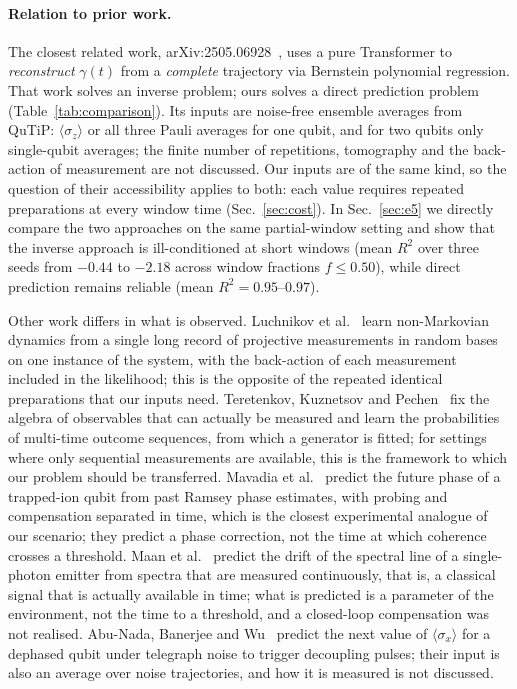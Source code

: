 \documentclass[twocolumn,10pt]{article}
\begin{document}
\paragraph{Relation to prior work.}
The closest related work, arXiv:2505.06928~\cite{TransformerLindblad2025},
uses a pure Transformer to \emph{reconstruct} $\gamma(t)$ from a
\emph{complete} trajectory via Bernstein polynomial regression.
That work solves an inverse problem; ours solves a direct prediction
problem (Table~\ref{tab:comparison}).
Its inputs are noise-free ensemble averages from QuTiP: $\langle\sigma_z\rangle$
or all three Pauli averages for one qubit, and for two qubits only
single-qubit averages; the finite number of repetitions, tomography and
the back-action of measurement are not discussed. Our inputs are of the
same kind, so the question of their accessibility applies to both: each
value requires repeated preparations at every window time
(Sec.~\ref{sec:cost}).
In Sec.~\ref{sec:e5} we directly compare the two approaches on the same
partial-window setting and show that the inverse approach is
ill-conditioned at short windows (mean $R^2$ over three seeds from $-0.44$
to $-2.18$ across window fractions $f \leq 0.50$), while direct prediction
remains reliable (mean $R^2 = 0.95$--$0.97$).

Other work differs in what is observed. Luchnikov et
al.~\cite{Luchnikov2020} learn non-Markovian dynamics from a single long
record of projective measurements in random bases on one instance of the
system, with the back-action of each measurement included in the
likelihood; this is the opposite of the repeated identical preparations
that our inputs need. Teretenkov, Kuznetsov and Pechen~\cite{Teretenkov2026}
fix the algebra of observables that can actually be measured and learn the
probabilities of multi-time outcome sequences, from which a generator is
fitted; for settings where only sequential measurements are available,
this is the framework to which our problem should be transferred.
Mavadia et al.~\cite{Mavadia2017} predict the future phase of a trapped-ion
qubit from past Ramsey phase estimates, with probing and compensation
separated in time, which is the closest experimental analogue of our
scenario; they predict a phase correction, not the time at which coherence
crosses a threshold. Maan et al.~\cite{Maan2026} predict the drift of the
spectral line of a single-photon emitter from spectra that are measured
continuously, that is, a classical signal that is actually available in time;
what is predicted is a parameter of the environment, not the time to a
threshold, and a closed-loop compensation was not realised. Abu-Nada,
Banerjee and Wu~\cite{AbuNada2026} predict the next value of
$\langle\sigma_x\rangle$ for a dephased qubit under telegraph noise to
trigger decoupling pulses; their input is also an average over noise
trajectories, and how it is measured is not discussed.
\end{document}

